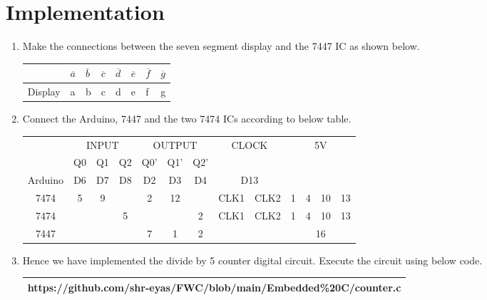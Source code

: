 \documentclass[journal,12pt]{IEEEtran}
\begin{document}
\section{Implementation}
\vspace{15pt}
\begin{enumerate}[label=\Roman*]

    \item Make the connections between the seven segment display and the 7447 IC as shown below. 
    \begin{table}[htbp]
      \centering
      \begin{tabular}{|>{\centering\arraybackslash}m{2cm}|*{7}{>{\centering\arraybackslash}m{1.5cm}|}}
        \hline
        7447 & $\overline{a}$ & $\overline{b}$ & $\overline{c}$ & $\overline{d}$ & $\overline{e}$ & $\overline{f}$ & $\overline{g}$ \\
        \hline
        Display & a & b & c & d & e & f & g \\
        \hline
      \end{tabular}
      \label{tab:sample}
    \end{table}

    \item Connect the Arduino, 7447 and the two 7474 ICs according to below table.
    \begin{table}[htbp]
      \centering
      \begin{tabular}{|c|c|c|c|c|c|c|c|c|c|c|c|c|}
        \hline
        \multirow{2}{*}{} & \multicolumn{3}{c|}{INPUT} & \multicolumn{3}{c|}{OUTPUT} & \multicolumn{2}{c|}{CLOCK} & \multicolumn{4}{c|}{5V}\\
        \cline{2-7}
         & Q0 & Q1 & Q2 & Q0' & Q1' & Q2' & \multicolumn{2}{c|}{} & \multicolumn{4}{c|}{} \\
        \hline        
        Arduino & D6 & D7 & D8 & D2 & D3 & D4 & \multicolumn{2}{c|}{D13} & \multicolumn{4}{c|}{}\\
        \hline
        7474 & 5 & 9 & {} & 2 & 12 & {} & CLK1 & CLK2 & 1 & 4 & 10 & 13\\
        \hline
        7474 & {} & {} & 5 & {} & {} & 2 & CLK1 & CLK2 & 1 & 4 & 10 & 13\\
        \hline
        7447 & \multicolumn{3}{c|}{} & 7 & 1 & 2 & & & \multicolumn{4}{c|}{16}\\
        \hline 
      \end{tabular}
      \label{tab:merge-cells}
    \end{table}

    \item Hence we have implemented the divide by 5 counter digital circuit. Execute the circuit using below code. \vspace{10pt} \\
    \begin{tabularx}{1\textwidth} { 
    | >{\centering\arraybackslash}X |}
    \hline
    https://github.com/shr-eyas/FWC/blob/main/Embedded\%20C/counter.c\\
    \hline
    \end{tabularx} \\
\end{enumerate}



\end{document}
